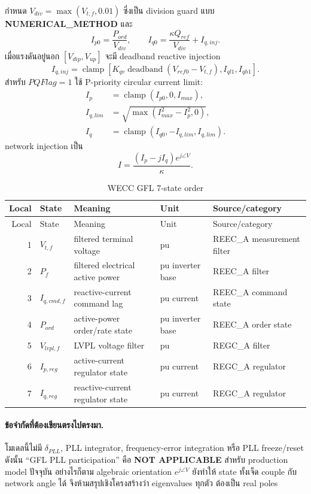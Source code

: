 \documentclass[12pt,a4paper]{article}
\newcommand{\numeric}{\textcolor{orange!80!black}{\textbf{NUMERICAL\_METHOD}}}
\newcommand{\notapp}{\textcolor{gray!75!black}{\textbf{NOT APPLICABLE}}}
\newcommand{\clamp}{\operatorname{clamp}}
\begin{document}
กำหนด $V_{div}=\max(V_{t,f},0.01)$ ซึ่งเป็น division guard แบบ
\numeric{} และ
\begin{equation}
I_{p0}=\frac{P_{ord}}{V_{div}},\qquad
I_{q0}=\frac{\kappa Q_{ref}}{V_{div}}+I_{q,inj}.
\end{equation}
เมื่อแรงดันอยู่นอก $[V_{dip},V_{up}]$ จะมี deadband reactive injection
\begin{equation}
I_{q,inj}=\clamp\!\left[K_{qv}\operatorname{deadband}(V_{ref0}-V_{t,f}),
I_{ql1},I_{qh1}\right].
\end{equation}
สำหรับ $PQFlag=1$ ใช้ P-priority circular current limit:
\begin{align}
I_p&=\clamp(I_{p0},0,I_{max}),\\
I_{q,lim}&=\sqrt{\max(I_{max}^2-I_p^2,0)},\\
I_q&=\clamp(I_{q0},-I_{q,lim},I_{q,lim}).
\end{align}
network injection เป็น
\begin{equation}
I=\frac{(I_p-jI_q)e^{j\angle V}}{\kappa}.
\label{eq:wecc-current}
\end{equation}

\begin{longtable}{r p{} p{} p{} p{}}
\caption{WECC GFL 7-state order}\label{tab:gfl-states}\\
\toprule Local & State & Meaning & Unit & Source/category \\\midrule
\endfirsthead
\toprule Local & State & Meaning & Unit & Source/category \\\midrule
\endhead
1 & $V_{t,f}$ & filtered terminal voltage & pu & REEC\_A measurement filter \\
2 & $P_f$ & filtered electrical active power & pu inverter base & REEC\_A filter \\
3 & $I_{q,cmd,f}$ & reactive-current command lag & pu current & REEC\_A command state \\
4 & $P_{ord}$ & active-power order/rate state & pu inverter base & REEC\_A order state \\
5 & $V_{lvpl,f}$ & LVPL voltage filter & pu & REGC\_A filter \\
6 & $I_{p,reg}$ & active-current regulator state & pu current & REGC\_A regulator \\
7 & $I_{q,reg}$ & reactive-current regulator state & pu current & REGC\_A regulator \\
\bottomrule
\end{longtable}

\paragraph{ข้อจำกัดที่ต้องเขียนตรงไปตรงมา.}
โมเดลนี้ไม่มี $\delta_{PLL}$, PLL integrator, frequency-error integration หรือ
PLL freeze/reset ดังนั้น ``GFL PLL participation'' คือ \notapp{} สำหรับ production
model ปัจจุบัน อย่างไรก็ตาม algebraic orientation $e^{j\angle V}$ ยังทำให้ state
ทั้งเจ็ด couple กับ network angle ได้ จึงห้ามสรุปเชิงโครงสร้างว่า eigenvalues ทุกตัว
ต้องเป็น real poles
\end{document}
